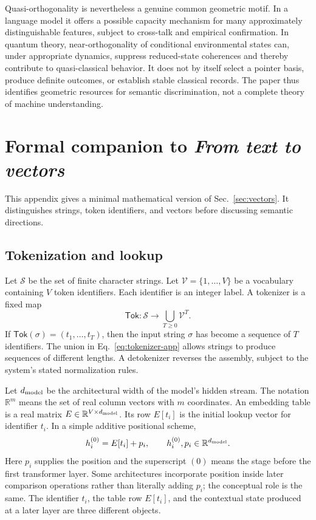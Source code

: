 \documentclass[
  aps,
  reprint,
  superscriptaddress,
  floatfix,
  nofootinbib,
  longbibliography
]{revtex4-2}
\newcommand{\R}{\mathbb{R}}
\begin{document}
Quasi-orthogonality is nevertheless a genuine common geometric motif.  In a
language model it offers a possible capacity mechanism for many approximately
distinguishable features, subject to cross-talk and empirical confirmation.
In quantum theory, near-orthogonality of conditional environmental states can,
under appropriate dynamics, suppress reduced-state coherences and thereby
contribute to quasi-classical behavior.  It does not by itself select a pointer
basis, produce definite outcomes, or establish stable classical records.  The
paper thus identifies geometric resources for semantic discrimination, not a
complete theory of machine understanding.

\appendix

\section{Formal companion to \emph{From text to vectors}}
\label{app:vectors}

This appendix gives a minimal mathematical version of
Sec.~\ref{sec:vectors}.  It distinguishes strings, token identifiers, and
vectors before discussing semantic directions.

\subsection{Tokenization and lookup}

Let $\mathcal S$ be the set of finite character strings.  Let
$\mathcal V=\{1,\ldots,V\}$ be a vocabulary containing $V$ token identifiers.
Each identifier is an integer label.  A tokenizer is a fixed map
\begin{equation}
 \mathsf{Tok}:\mathcal S\longrightarrow
 \bigcup_{T\geq0}\mathcal V^T.
 \label{eq:tokenizer-app}
\end{equation}
If $\mathsf{Tok}(\sigma)=(t_1,\ldots,t_T)$, then the input string $\sigma$
has become a sequence of $T$ identifiers.  The union in
Eq.~\eqref{eq:tokenizer-app} allows strings to produce sequences of different
lengths.  A detokenizer reverses the assembly, subject to the system's stated
normalization rules.

Let $d_{\rm model}$ be the architectural width of the model's hidden stream.
The notation $\R^m$ means the set of real column vectors with $m$ coordinates.
An embedding table is a real matrix
$E\in\R^{V\times d_{\rm model}}$.  Its row $E[t_i]$ is the initial lookup
vector for identifier $t_i$.  In a simple additive positional scheme,
\begin{equation}
 h_i^{(0)}=E[t_i]+p_i,
 \qquad h_i^{(0)},p_i\in\R^{d_{\rm model}}.
 \label{eq:lookup-app}
\end{equation}
Here $p_i$ supplies the position and the superscript $(0)$ means the stage
before the first transformer layer.  Some architectures incorporate position
inside later comparison operations rather than literally adding $p_i$; the
conceptual role is the same.  The identifier $t_i$, the table row $E[t_i]$, and the
contextual state produced at a later layer are three different objects.
\end{document}
